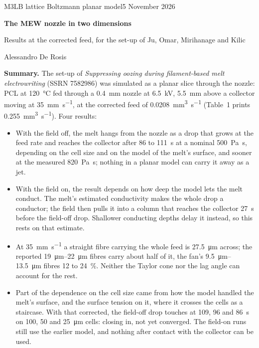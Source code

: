 \documentclass[10pt,a4paper]{article}
\begin{document}
{\sffamily\footnotesize\color{inkthree}M3LB \textperiodcentered{} lattice Boltzmann \textperiodcentered{} planar model\hfill 5 November 2026\par}
\vspace{6pt}
{\sffamily\bfseries\LARGE The MEW nozzle in two dimensions\par}
\vspace{3pt}
{\sffamily\large\color{inktwo}Results at the corrected feed, for the set-up of Ju, Omar, Mirihanage and Kilic\par}
\vspace{3pt}
{\small Alessandro De Rosis\par}
\vspace{8pt}

\textbf{Summary.} The set-up of \emph{Suppressing oozing during filament-based melt electrowriting}
(SSRN 7582986) was simulated as a planar slice through the nozzle: PCL at \qty{120}{\celsius} fed
through a \qty{0.4}{\milli\metre} nozzle at \qty{6.5}{\kilo\volt}, \qty{5.5}{\milli\metre} above a
collector moving at \qty{35}{\milli\metre\per\second}, at the corrected feed of
\qty{0.0208}{\cubic\milli\metre\per\second} (Table~1 prints \qty{0.255}{\cubic\milli\metre\per\second}).
Four results:
\begin{itemize}
  \item With the field off, the melt hangs from the nozzle as a drop that grows at the feed rate and
    reaches the collector after 86 to \qty{111}{\second} at a nominal \qty{500}{\pascal\second}, depending
    on the cell size and on the model of the melt's surface, and sooner at the measured
    \qty{820}{\pascal\second}; nothing in a planar model can carry it away as a jet.
  \item With the field on, the result depends on how deep the model lets the melt conduct. The melt's
    estimated conductivity makes the whole drop a conductor; the field then pulls it into a column that
    reaches the collector \qty{27}{\second} before the field-off drop. Shallower conducting depths delay
    it instead, so this rests on that estimate.
  \item At \qty{35}{\milli\metre\per\second} a straight fibre carrying the whole feed is
    \qty{27.5}{\micro\metre} across; the reported \qtyrange{19}{22}{\micro\metre} fibres carry about half
    of it, the fan's \qtyrange{9.5}{13.5}{\micro\metre} fibres 12 to \qty{24}{\percent}. Neither the Taylor
    cone nor the lag angle can account for the rest.
  \item Part of the dependence on the cell size came from how the model handled the melt's surface, and
    the surface tension on it, where it crosses the cells as a staircase. With that corrected, the
    field-off drop touches at 109,
    96 and \qty{86}{\second} on 100, 50 and \qty{25}{\micro\metre} cells: closing in, not yet converged.
    The field-on runs still use the earlier model, and nothing after contact with the collector can be used.
\end{itemize}
\end{document}
